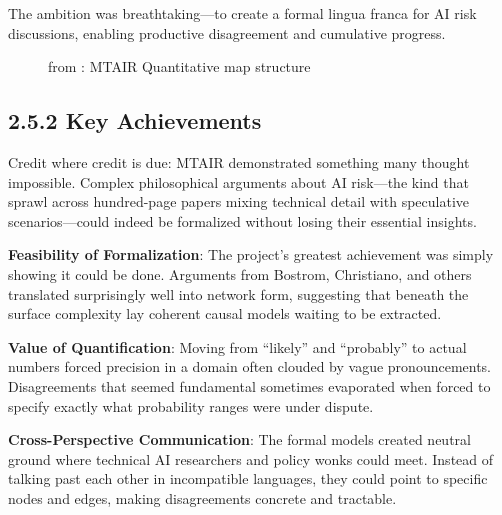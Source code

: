 \documentclass[
  11pt,
  letterpaper,
]{book}
\begin{document}
The ambition was breathtaking---to create a formal lingua franca for AI
risk discussions, enabling productive disagreement and cumulative
progress.

\begin{figure}


\caption[MTAIR Quantitative map
structure]{\label{fig-mtair-quant-map}from \textcite{clarke2022}: MTAIR
Quantitative map structure}

\end{figure}%

\subsection{2.5.2 Key Achievements}\label{sec-mtair-achievements}

Credit where credit is due: MTAIR demonstrated something many thought
impossible. Complex philosophical arguments about AI risk---the kind
that sprawl across hundred-page papers mixing technical detail with
speculative scenarios---could indeed be formalized without losing their
essential insights.

\textbf{Feasibility of Formalization}: The project's greatest
achievement was simply showing it could be done. Arguments from Bostrom,
Christiano, and others translated surprisingly well into network form,
suggesting that beneath the surface complexity lay coherent causal
models waiting to be extracted.

\textbf{Value of Quantification}: Moving from ``likely'' and
``probably'' to actual numbers forced precision in a domain often
clouded by vague pronouncements. Disagreements that seemed fundamental
sometimes evaporated when forced to specify exactly what probability
ranges were under dispute.

\textbf{Cross-Perspective Communication}: The formal models created
neutral ground where technical AI researchers and policy wonks could
meet. Instead of talking past each other in incompatible languages, they
could point to specific nodes and edges, making disagreements concrete
and tractable.
\end{document}
